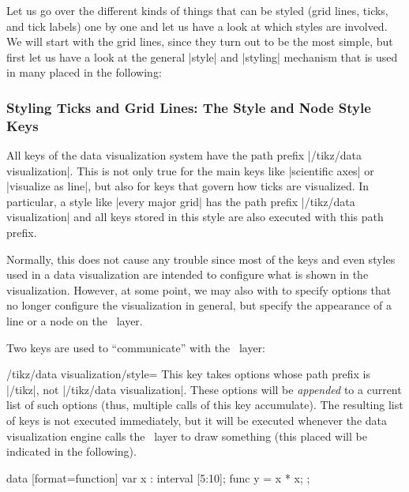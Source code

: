 Let us go over the different kinds of things that can be styled (grid lines,
ticks, and tick labels) one by one and let us have a look at which styles are
involved. We will start with the grid lines, since they turn out to be the most
simple, but first let us have a look at the general |style| and |styling|
mechanism that is used in many placed in the following:


\subsubsection{Styling Ticks and Grid Lines: The Style and Node Style Keys}
\label{section-dv-style}

All keys of the data visualization system have the path prefix
|/tikz/data visualization|. This is not only true for the main keys like
|scientific axes| or |visualize as line|, but also for keys that govern how
ticks are visualized. In particular, a style like |every major grid| has the
path prefix |/tikz/data visualization| and all keys stored in this style are
also executed with this path prefix.

Normally, this does not cause any trouble since most of the keys and even
styles used in a data visualization are intended to configure what is shown in
the visualization. However, at some point, we may also with to specify options
that no longer configure the visualization in general, but specify the
appearance of a line or a node on the \tikzname\ layer.

Two keys are used to ``communicate'' with the \tikzname\ layer:

\begin{key}{/tikz/data visualization/style=}
    This key takes options whose path prefix is |/tikz|, not
    |/tikz/data visualization|. These options will be \emph{appended} to a
    current list of such options (thus, multiple calls of this key accumulate).
    The resulting list of keys is not executed immediately, but it will be
    executed whenever the data visualization engine calls the \tikzname\ layer
    to draw something (this placed will be indicated in the following).
\begin{codeexample}[preamble={\usetikzlibrary{datavisualization.formats.functions}}]
\tikz \datavisualization
  [scientific axes,
   all axes={ticks={style=blue}, length=3cm},
   y axis={grid, grid={minor steps between steps, major={style=red}}},
   visualize as line]
  data [format=function] {
    var x : interval [5:10];
    func y = \value x * \value x;
  };
\end{codeexample}
\end{key}

